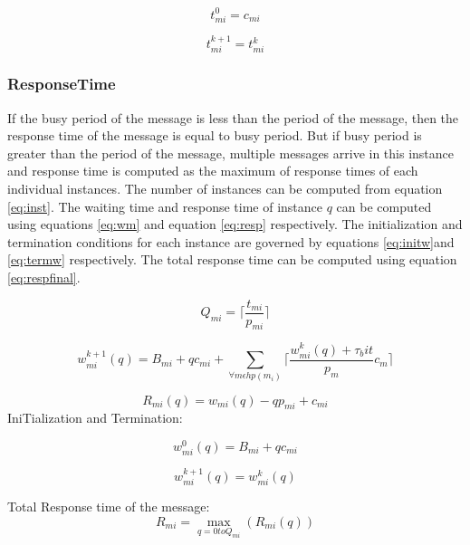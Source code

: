 \begin{equation}
t_{mi}^0=c_{mi}
\label{eq:ter}
\end{equation}

\begin{equation}
t_{mi}^{k+1}=t_{mi}^{k}
\label{eq:busy}
\end{equation}

\subsubsection{ResponseTime}
If the busy period of the message is less than the period of the message, then the response time of the message is equal to busy period. But if busy period is greater than the period of the message, multiple messages arrive in this instance and response time is computed as the maximum of response times of each individual instances. The number of instances can be computed from equation \ref{eq:inst}. The waiting time and response time of instance $q$ can be computed using equations \ref{eq:wm} and equation \ref{eq:resp} respectively. The initialization and termination conditions for each instance are governed by equations \ref{eq:initw}and \ref{eq:termw} respectively. The total response time can be computed using equation \ref{eq:respfinal}. 

\begin{equation}
Q_{mi}=\lceil \frac{t_{mi}}{p_{mi}}\rceil
\label{eq:inst}
\end{equation}


\begin{equation}
w_{mi}^{k+1}(q)=B_{mi}+qc_{mi}+\sum_{\forall m\epsilon hp(m_i)}\lceil \frac{w_{mi}^k(q)+\tau_bit}{p_{m}}c_m \rceil
\label{eq:wm}
\end{equation}

\begin{equation}
R_{mi}(q)=w_{mi}(q)-qp_{mi}+c_{mi}
\label{eq:resp}
\end{equation}
IniTialization and Termination:

\begin{equation}
w_{mi}^{0}(q)=B_{mi}+qc_{mi}
\label{eq:initw}
\end{equation}

\begin{equation}
w_{mi}^{k+1}(q)=w_{mi}^{k}(q)
\label{eq:termw}
\end{equation}

Total Response time of the message:
\begin{equation}
R_{mi}=\max_{q=0toQ_{mi}}(R_{mi}(q)) 
\label{eq:respfinal}
\end{equation}


